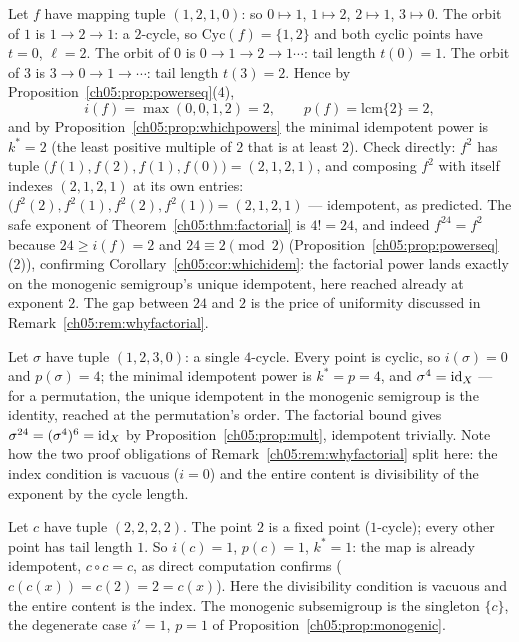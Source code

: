 \begin{example}
\label{ch05:ex:mixed}
Let $f$ have mapping tuple $(1, 2, 1, 0)$: so $0 \mapsto 1$,
$1 \mapsto 2$, $2 \mapsto 1$, $3 \mapsto 0$. The orbit of $1$ is
$1 \to 2 \to 1$: a $2$-cycle, so $\mathrm{Cyc}(f) = \{1, 2\}$ and both
cyclic points have $t = 0$, $\ell = 2$. The orbit of $0$ is
$0 \to 1 \to 2 \to 1 \cdots$: tail length $t(0) = 1$. The orbit of $3$ is
$3 \to 0 \to 1 \to \cdots$: tail length $t(3) = 2$. Hence by
Proposition~\ref{ch05:prop:powerseq}(4),
\[
  i(f) = \max(0, 0, 1, 2) = 2,
  \qquad
  p(f) = \mathrm{lcm}\{2\} = 2,
\]
and by Proposition~\ref{ch05:prop:whichpowers} the minimal idempotent
power is $k^{*} = 2$ (the least positive multiple of $2$ that is at least
$2$). Check directly: $f^{2}$ has tuple
$\bigl(f(1), f(2), f(1), f(0)\bigr) = (2, 1, 2, 1)$, and composing
$f^{2}$ with itself indexes $(2,1,2,1)$ at its own entries:
$\bigl(f^{2}(2), f^{2}(1), f^{2}(2), f^{2}(1)\bigr) = (2, 1, 2, 1)$ ---
idempotent, as predicted. The safe exponent of
Theorem~\ref{ch05:thm:factorial} is $4! = 24$, and indeed
$f^{24} = f^{2}$ because $24 \ge i(f) = 2$ and $24 \equiv 2 \pmod 2$
(Proposition~\ref{ch05:prop:powerseq}(2)), confirming
Corollary~\ref{ch05:cor:whichidem}: the factorial power lands exactly on
the monogenic semigroup's unique idempotent, here reached already at
exponent $2$. The gap between $24$ and $2$ is the price of uniformity
discussed in Remark~\ref{ch05:rem:whyfactorial}.
\end{example}

\begin{example}
\label{ch05:ex:perm}
Let $\sigma$ have tuple $(1, 2, 3, 0)$: a single $4$-cycle. Every point is
cyclic, so $i(\sigma) = 0$ and $p(\sigma) = 4$; the minimal idempotent
power is $k^{*} = p = 4$, and $\sigma^{4} = \mathrm{id}_X$ --- for a permutation,
the unique idempotent in the monogenic semigroup is the identity, reached
at the permutation's order. The factorial bound gives
$\sigma^{24} = (\sigma^{4})^{6} = \mathrm{id}_X$ by
Proposition~\ref{ch05:prop:mult}, idempotent trivially. Note how the two
proof obligations of Remark~\ref{ch05:rem:whyfactorial} split here: the
index condition is vacuous ($i = 0$) and the entire content is
divisibility of the exponent by the cycle length.
\end{example}

\begin{example}
\label{ch05:ex:const}
Let $c$ have tuple $(2, 2, 2, 2)$. The point $2$ is a fixed point
($1$-cycle); every other point has tail length $1$. So $i(c) = 1$,
$p(c) = 1$, $k^{*} = 1$: the map is already idempotent, $c \circ c = c$,
as direct computation confirms ($c(c(x)) = c(2) = 2 = c(x)$). Here the
divisibility condition is vacuous and the entire content is the index. The
monogenic subsemigroup is the singleton $\{c\}$, the degenerate case
$i' = 1$, $p = 1$ of Proposition~\ref{ch05:prop:monogenic}.
\end{example}

